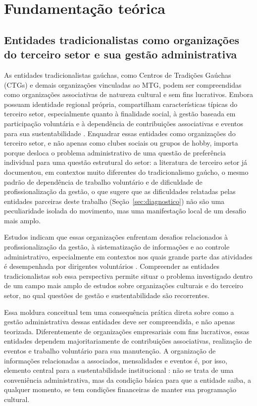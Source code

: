 \documentclass[12pt,a4paper]{article}
\begin{document}
\section{Fundamentação teórica}

\subsection{Entidades tradicionalistas como organizações do terceiro setor e sua gestão
administrativa}

As entidades tradicionalistas gaúchas, como Centros de Tradições Gaúchas (CTGs) e demais
organizações vinculadas ao MTG, podem ser compreendidas como organizações associativas de natureza
cultural e sem fins lucrativos. Embora possuam identidade regional própria, compartilham
características típicas do terceiro setor, especialmente quanto à finalidade social, à gestão
baseada em participação voluntária e à dependência de contribuições associativas e eventos para sua
sustentabilidade \parencite{vargas2019}. Enquadrar essas entidades como organizações do terceiro
setor, e não apenas como clubes sociais ou grupos de hobby, importa porque desloca o problema
administrativo de uma questão de preferência individual para uma questão estrutural do setor: a
literatura de terceiro setor já documentou, em contextos muito diferentes do tradicionalismo gaúcho,
o mesmo padrão de dependência de trabalho voluntário e de dificuldade de profissionalização da
gestão, o que sugere que as dificuldades relatadas pelas entidades parceiras deste trabalho
(Seção~\ref{sec:diagnostico}) não são uma peculiaridade isolada do movimento, mas uma manifestação
local de um desafio mais amplo.

Estudos indicam que essas organizações enfrentam desafios relacionados à profissionalização da
gestão, à sistematização de informações e ao controle administrativo, especialmente em contextos nos
quais grande parte das atividades é desempenhada por dirigentes voluntários
\parencite{fabricio2019,silvaalbarello2024}. Compreender as entidades tradicionalistas sob essa
perspectiva permite situar o problema investigado dentro de um campo mais amplo de estudos sobre
organizações culturais e do terceiro setor, no qual questões de gestão e sustentabilidade são
recorrentes.

Essa moldura conceitual tem uma consequência prática direta sobre como a gestão administrativa dessas
entidades deve ser compreendida, e não apenas teorizada. Diferentemente de organizações empresariais
com fins lucrativos, essas entidades dependem majoritariamente de contribuições associativas,
realização de eventos e trabalho voluntário para sua manutenção. A organização de informações
relacionadas a associados, mensalidades e eventos é, por isso, elemento central para a
sustentabilidade institucional \parencite{martini2019}: não se trata de uma conveniência
administrativa, mas da condição básica para que a entidade saiba, a qualquer momento, se tem
condições financeiras de manter sua programação cultural.
\end{document}
